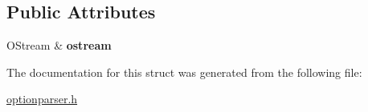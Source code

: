 \subsection*{Public Attributes}
\begin{DoxyCompactItemize}
\item 
O\+Stream \& {\bfseries ostream}\hypertarget{structoption_1_1PrintUsageImplementation_1_1OStreamWriter_a9b808696e204a834acd4362c62b9f4c1}{}\label{structoption_1_1PrintUsageImplementation_1_1OStreamWriter_a9b808696e204a834acd4362c62b9f4c1}

\end{DoxyCompactItemize}


The documentation for this struct was generated from the following file\+:\begin{DoxyCompactItemize}
\item 
\hyperlink{optionparser_8h}{optionparser.\+h}\end{DoxyCompactItemize}
